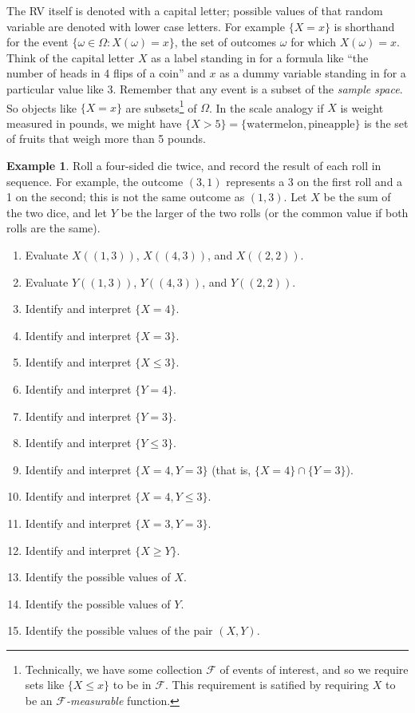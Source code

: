 \documentclass[
]{book}
\providecommand{\tightlist}{%
  \setlength{\itemsep}{0pt}\setlength{\parskip}{0pt}}
\theoremstyle{definition}
\theoremstyle{definition}
\newtheorem{example}{Example}[chapter]
\theoremstyle{definition}
\theoremstyle{remark}
\begin{document}
The RV itself is denoted with a capital letter; possible values of that
random variable are denoted with lower case letters. For example \(\{X=x\}\) is shorthand for the event \(\{\omega\in\Omega: X(\omega)=x\}\), the set of outcomes \(\omega\) for which \(X(\omega)=x\). Think of the capital letter \(X\) as a label standing in for a formula like ``the number of heads in 4 flips of a coin'' and \(x\) as a dummy variable
standing in for a particular value like 3. Remember that any event is a subset of the \emph{sample space}. So objects like \(\{X=x\}\) are subsets\footnote{Technically, we have some collection \(\mathcal{F}\) of events of interest, and so we require sets like \(\{X\le x\}\) to be in \(\mathcal{F}\). This requirement is satified by requiring \(X\) to be an \emph{\(\mathcal{F}\)-measurable} function.} of \(\Omega\). In the scale analogy if \(X\) is weight measured in pounds, we might have \(\{X>5\}=\{\text{watermelon}, \text{pineapple}\}\) is the set of fruits that weigh more than 5 pounds.

\begin{example}
\protect\hypertarget{exm:dice-rv}{}{\label{exm:dice-rv} }Roll a four-sided die twice, and record the result of each roll in sequence. For example, the outcome \((3, 1)\) represents a 3 on the first roll and a 1 on the second; this is not the same outcome as \((1, 3)\). Let \(X\) be the sum of the two dice, and let \(Y\) be the larger of the two rolls (or the common value if both rolls are the same).
\end{example}

\begin{enumerate}
\def\labelenumi{\arabic{enumi}.}
\tightlist
\item
  Evaluate \(X((1, 3))\), \(X((4, 3))\), and \(X((2,2))\).
\item
  Evaluate \(Y((1, 3))\), \(Y((4, 3))\), and \(Y((2,2))\).
\item
  Identify and interpret \(\{X = 4\}\).
\item
  Identify and interpret \(\{X = 3\}\).
\item
  Identify and interpret \(\{X \le 3\}\).
\item
  Identify and interpret \(\{Y = 4\}\).
\item
  Identify and interpret \(\{Y = 3\}\).
\item
  Identify and interpret \(\{Y \le 3\}\).
\item
  Identify and interpret \(\{X = 4, Y = 3\}\) (that is, \(\{X = 4\}\cap \{Y = 3\}\)).
\item
  Identify and interpret \(\{X = 4, Y \le 3\}\).
\item
  Identify and interpret \(\{X = 3, Y = 3\}\).
\item
  Identify and interpret \(\{X \ge Y\}\).
\item
  Identify the possible values of \(X\).
\item
  Identify the possible values of \(Y\).
\item
  Identify the possible values of the pair \((X, Y)\).
\end{enumerate}
\end{document}
